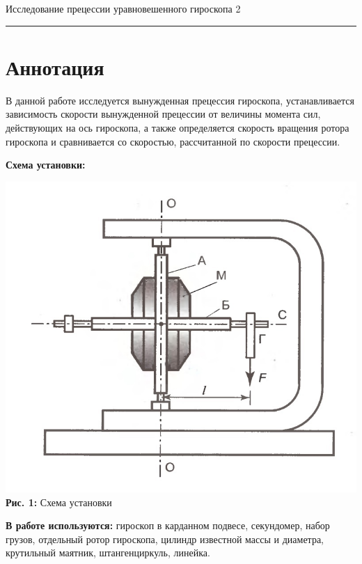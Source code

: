 \documentclass[12pt,a4paper]{scrartcl}
\begin{document}
	
	\begin{flushleft}
		\footnotesize{Исследование прецессии уравновешенного гироскопа} \hspace{\fill} \footnotesize{2}
		\\[-0.3cm]\noindent\rule{\textwidth}{0.3pt}
	\end{flushleft}

	\section{Аннотация}
	
	В данной работе исследуется вынужденная прецессия гироскопа, устанавливается зависимость скорости вынужденной прецессии от величины момента сил, действующих на ось гироскопа, а также определяется скорость вращения ротора гироскопа и сравнивается со скоростью, рассчитанной по скорости прецессии.

	\textbf{Схема установки:}
	\begin{center}
		\includegraphics[scale=0.2]{PIC_1.jpg}
		\\\textbf{Рис. 1:} Схема установки
	\end{center}
	

	\textbf{В работе используются:} гироскоп в карданном подвесе, секундомер, набор грузов, отдельный ротор гироскопа, цилиндр известной массы и диаметра, крутильный маятник, штангенциркуль, линейка.
	 
\end{document}
